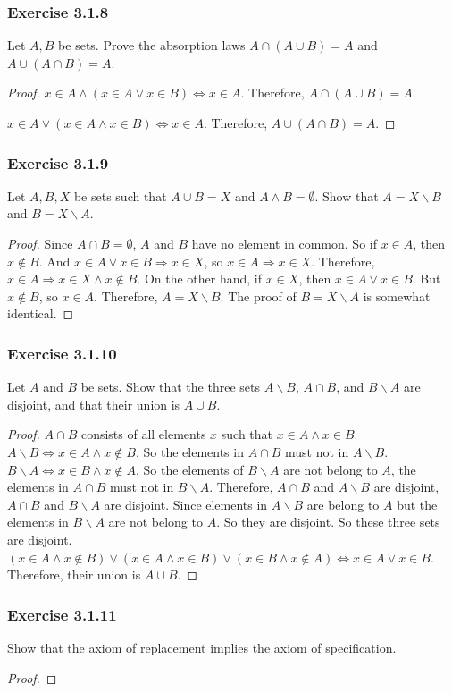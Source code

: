 \documentclass[12pt, letter]{article}
\begin{document}
\subsubsection*{Exercise 3.1.8}
Let $A,B$ be sets. Prove the absorption laws $A\cap(A\cup B)=A$ and $A\cup(A\cap B)=A$.
\begin{proof}
    $x\in A\land (x\in A\lor x\in B)\iff x\in A$. Therefore, $A\cap(A\cup B)=A$.

    $x\in A\lor(x\in A\land x\in B) \iff x\in A$. Therefore, $A\cup(A\cap B)=A$.
\end{proof}
\subsubsection*{Exercise 3.1.9}
Let $A,B,X$ be sets such that $A\cup B=X$ and $A\land B=\emptyset$. Show that $A=X\backslash B$ and $B=X\backslash A$.
\begin{proof}
    Since $A\cap B=\emptyset$, $A$ and $B$ have no element in common. So if $x\in A$, then $x\notin B$. And $x\in A\lor x\in B\Rightarrow x\in X$, so $x\in A\Rightarrow x\in X$. Therefore, $x\in A\Rightarrow x\in X\land x\notin B$.
    On the other hand, if $x\in X$, then $x\in A\lor x\in B$. But $x\notin B$, so $x\in A$. Therefore, $A=X\backslash B$.
    The proof of $B=X\backslash A$ is somewhat identical. 
\end{proof}
\subsubsection*{Exercise 3.1.10}
Let $A$ and $B$ be sets. Show that the three sets $A\backslash B$, $A\cap B$, and $B\backslash A$ are disjoint, and that their union is $A\cup B$.
\begin{proof}
    $A\cap B$ consists of all elements $x$ such that $x\in A\land x\in B$. $A\backslash B\iff x\in A\land x\notin B$. So the elements in $A\cap B$ must not in $A\backslash B$. 
    $B\backslash A\iff x\in B\land x\notin A$. So the elements of $B\backslash A$ are not belong to $A$, the elements in $A\cap B$ must not in $B\backslash A$. Therefore, $A\cap B$ and $A\backslash B$ are disjoint,
    $A\cap B$ and $B\backslash A$ are disjoint. Since elements in $A\backslash B$ are belong to $A$ but the elements in $B\backslash A$ are not belong to $A$. So they are disjoint. 
    So these three sets are disjoint. $(x\in A\land x\notin B)\lor(x\in A\land x\in B)\lor(x\in B\land x\notin A)\iff x\in A\lor x\in B$. Therefore, their union is $A\cup B$.
\end{proof}
\subsubsection*{Exercise 3.1.11}
Show that the axiom of replacement implies the axiom of specification.
\begin{proof}
    
\end{proof}
\end{document}
